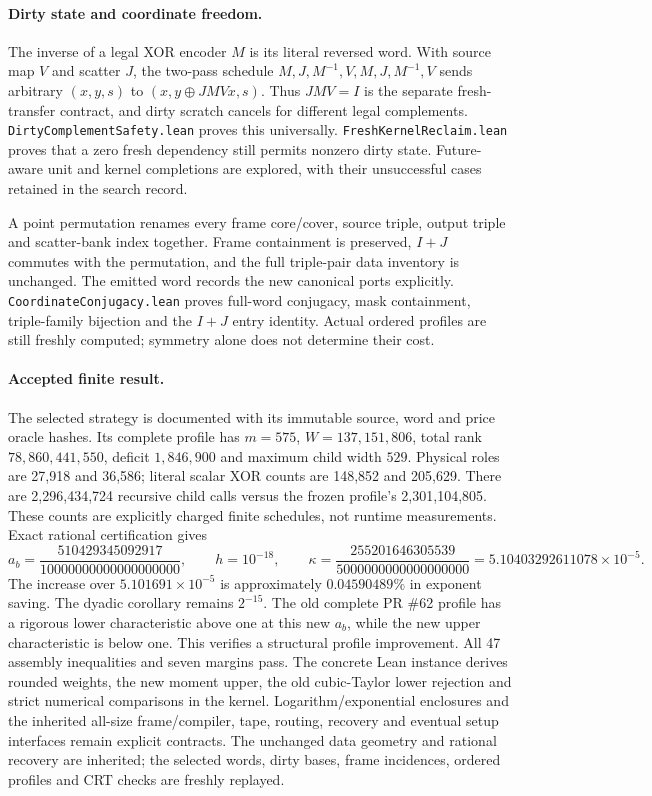 \documentclass[11pt]{article}
\begin{document}
\paragraph{Dirty state and coordinate freedom.}
The inverse of a legal XOR encoder $M$ is its literal reversed word. With
source map $V$ and scatter $J$, the two-pass schedule
$M,J,M^{-1},V,M,J,M^{-1},V$ sends arbitrary $(x,y,s)$ to
$(x,y\mathbin{\oplus}JMVx,s)$. Thus $JMV=I$ is the separate fresh-transfer
contract, and dirty scratch cancels for different legal complements.
\texttt{DirtyComplementSafety.lean} proves this universally.
\texttt{FreshKernelReclaim.lean} proves that a zero fresh dependency still
permits nonzero dirty state. Future-aware unit and kernel completions are
explored, with their unsuccessful cases retained in the search record.

A point permutation renames every frame core/cover, source triple, output
triple and scatter-bank index together. Frame containment is preserved,
$I+J$ commutes with the permutation, and the full triple-pair data inventory
is unchanged. The emitted word records the new canonical ports explicitly.
\texttt{CoordinateConjugacy.lean} proves full-word conjugacy, mask containment,
triple-family bijection and the $I+J$ entry identity. Actual ordered profiles
are still freshly computed; symmetry alone does not determine their cost.

\paragraph{Accepted finite result.}
The selected strategy is documented with its immutable source, word and price
oracle hashes. Its complete profile has $m=575$, $W=137,151,806$,
total rank $78,860,441,550$, deficit $1,846,900$ and maximum child
width $529$. Physical roles are 27,918 and
36,586; literal scalar XOR counts are
148,852 and 205,629.
There are 2,296,434,724 recursive child calls versus the frozen profile's
2,301,104,805. These counts are explicitly charged finite schedules, not
runtime measurements. Exact rational certification gives
\[
 a_b=\frac{510429345092917}{10000000000000000000},\qquad h=10^{-18},\qquad
 \kappa=\frac{255201646305539}{5000000000000000000}=5.10403292611078\times10^{-5}.
\]
The increase over $5.101691\times10^{-5}$ is approximately
$0.04590489\%$ in exponent saving. The dyadic corollary remains $2^{-15}$.
The old complete PR \#62 profile has a rigorous lower characteristic above
one at this new $a_b$, while the new upper characteristic is below one.
This verifies a structural profile improvement. All 47 assembly inequalities
and seven margins pass. The concrete Lean instance derives rounded weights,
the new moment upper, the old cubic-Taylor lower rejection and strict numerical
comparisons in the kernel. Logarithm/exponential enclosures and the inherited
all-size frame/compiler, tape, routing, recovery and eventual setup interfaces
remain explicit contracts. The unchanged data geometry and rational recovery
are inherited; the selected words, dirty bases, frame incidences, ordered
profiles and CRT checks are freshly replayed.
\end{document}
